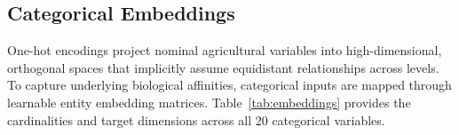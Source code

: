 \documentclass[conference,10pt,letterpaper]{IEEEtran}
\begin{document}
\subsection{Categorical Embeddings}
\label{sec:embeddings}
One-hot encodings project nominal agricultural variables into high-dimensional, orthogonal spaces that implicitly assume equidistant relationships across levels. To capture underlying biological affinities, categorical inputs are mapped through learnable entity embedding matrices. Table~\ref{tab:embeddings} provides the cardinalities and target dimensions across all 20 categorical variables.

\end{document}
